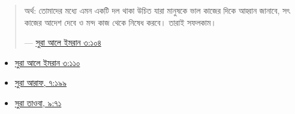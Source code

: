 \documentclass[
]{book}
\begin{document}
\begin{quote}
অর্থ: তোমাদের মধ্যে এমন একটি দল থাকা উচিত যারা মানুষকে ভাল কাজের দিকে আহ্বান জানাবে, সৎ কাজের আদেশ দেবে ও মন্দ কাজ থেকে নিষেধ করবে। তারাই সফলকাম।

--- \href{https://tanzil.net/\#3:104}{সুরা আলে ইমরান ৩:১০৪}
\end{quote}

\begin{itemize}
\item
  \href{https://tanzil.net/\#3:110}{সুরা আলে ইমরান ৩:১১০}
\item
  \href{https://tanzil.net/\#7:199}{সুরা আরাফ, ৭:১৯৯}
\item
  \href{https://tanzil.net/\#9:71}{সুরা তাওবা, ৯:৭১}
\end{itemize}
\end{document}

